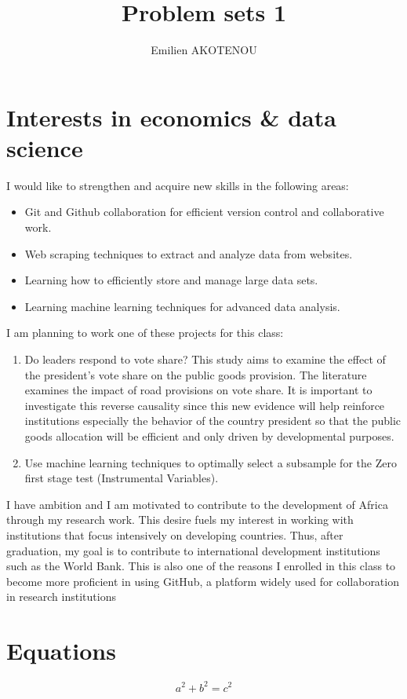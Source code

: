 \documentclass{article}
\title{Problem sets 1}
\author{Emilien AKOTENOU}
\begin{document}
\maketitle


\section{Interests in economics \& data science}
I would like to strengthen and acquire new skills in the following areas: 

\begin{itemize}
\item Git and Github collaboration for efficient version control and collaborative work.
\item Web scraping techniques to extract and analyze data from websites.
\item Learning how to efficiently store and manage large data sets.
\item  Learning machine learning techniques for advanced data analysis.
\end{itemize}
I am planning to work one of these projects for this class:
\begin{enumerate}
\item Do leaders respond to vote share? This study aims to examine the effect of the president’s vote share on the public goods provision. The literature examines the impact of road provisions on vote share. It is important to investigate this reverse causality since this new evidence will help reinforce institutions especially the behavior of the country president so that the public goods allocation will be efficient and only driven by developmental purposes.
\item Use machine learning techniques to optimally select a subsample for the Zero first stage test (Instrumental Variables).
\end{enumerate}

I have ambition and I am motivated to contribute to the development of Africa through my research work. This desire fuels my interest in working with institutions that focus intensively on developing countries. Thus, after graduation, my goal is to contribute to international development institutions such as the World Bank. This is also one of the reasons I enrolled in this class to become more proficient in using GitHub, a platform widely used for collaboration in research institutions

\section{Equations}

\[a^2 + b^2 = c^2\] 
\end{document}
